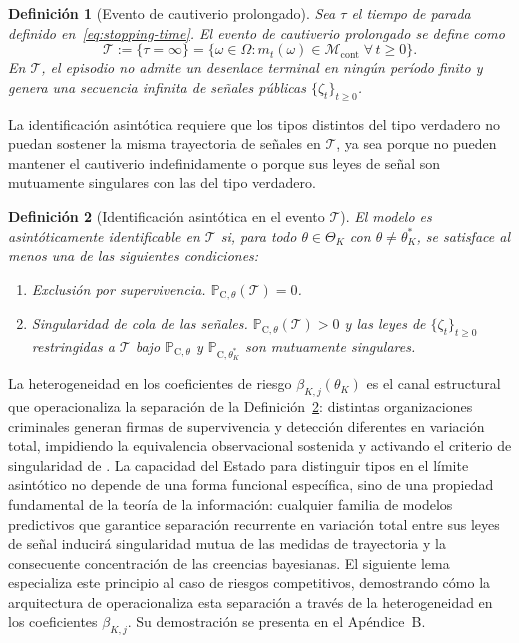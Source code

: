 \documentclass[pdflatex,sn-mathphys-ay]{sn-jnl}
\theoremstyle{thmstyleone}
\theoremstyle{thmstyletwo}
\theoremstyle{thmstylethree}
\newtheorem{definition}{Definición}
\newcommand{\ProbC}[1]{\mathbb{P}_{\mathrm{C},#1}}
\newcommand{\ThetaK}{\Theta_K}
\newcommand{\1}{\mathbf{1}}
\begin{document}
\begin{definition}[Evento de cautiverio prolongado]\label{def:event-T-long}
Sea $\tau$ el tiempo de parada definido en~\eqref{eq:stopping-time}. El evento de cautiverio prolongado se define como
\[
\mathcal{T}:=\{\tau=\infty\}=\bigl\{\omega\in\Omega:m_t(\omega)\in\mathcal{M}_{\mathrm{cont}}\;\forall\,t\ge 0\bigr\}.
\]
En $\mathcal{T}$, el episodio no admite un desenlace terminal en ningún período finito y genera una secuencia infinita de señales públicas $\{\zeta_t\}_{t\ge 0}$.
\end{definition}

La identificación asintótica requiere que los tipos distintos del tipo verdadero no puedan sostener la misma trayectoria de señales en $\mathcal{T}$, ya sea porque no pueden mantener el cautiverio indefinidamente o porque sus leyes de señal son mutuamente singulares con las del tipo verdadero.

\begin{definition}[Identificación asintótica en el evento $\mathcal{T}$]\label{def:asymptotic-id}
El modelo es asintóticamente identificable en $\mathcal{T}$ si, para todo $\theta\in\ThetaK$ con $\theta\neq\theta_K^\ast$, se satisface al menos una de las siguientes condiciones:
\begin{enumerate}
  \item[\textup{(a)}] Exclusión por supervivencia. $\ProbC{\theta}(\mathcal{T})=0$.
  \item[\textup{(b)}] Singularidad de cola de las señales. $\ProbC{\theta}(\mathcal{T})>0$ y las leyes de $\{\zeta_t\}_{t\ge 0}$ restringidas a $\mathcal{T}$ bajo $\ProbC{\theta}$ y $\ProbC{\theta_K^\ast}$ son mutuamente singulares.
\end{enumerate}
\end{definition}

La heterogeneidad en los coeficientes de riesgo $\beta_{K,j}(\theta_K)$ es el canal estructural que operacionaliza la separación de la Definición~\ref{def:asymptotic-id}: distintas organizaciones criminales generan firmas de supervivencia y detección diferentes en variación total, impidiendo la equivalencia observacional sostenida y activando el criterio de singularidad de \citet{Kakutani1948}. La capacidad del Estado para distinguir tipos en el límite asintótico no depende de una forma funcional específica, sino de una propiedad fundamental de la teoría de la información: cualquier familia de modelos predictivos que garantice separación recurrente en variación total entre sus leyes de señal inducirá singularidad mutua de las medidas de trayectoria y la consecuente concentración de las creencias bayesianas. El siguiente lema especializa este principio al caso de riesgos competitivos, demostrando cómo la arquitectura de \citet{Cox1972} operacionaliza esta separación a través de la heterogeneidad en los coeficientes $\beta_{K,j}$. Su demostración se presenta en el Apéndice~B.
\end{document}

